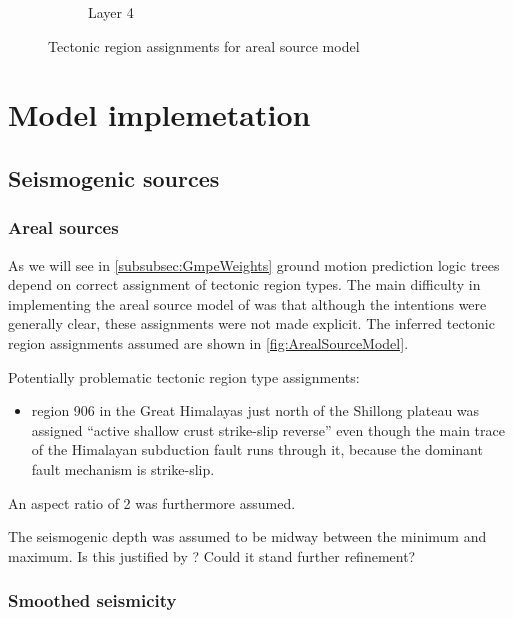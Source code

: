 \documentclass{article}
\begin{document}
\begin{figure}
\begin{subfigure}[b]{0.48\textwidth}
        \caption{Layer 4}
        \label{fig:ArealLayer4}
    \end{subfigure}
    \caption[Tectonic region assignments for areal source model]
    {Tectonic region assignments for areal source model} 
    \label{fig:ArealSourceModel}
\end{figure}

\section{Model implemetation}
\label{sec:Model}

\subsection{Seismogenic sources}
\label{sec:Sources}

\cite{thingbaijam2012seismogenic}

\subsubsection{Areal sources}
\label{sec:Areal}

As we will see in \autoref{subsubsec:GmpeWeights} ground motion prediction logic trees depend on correct assignment of tectonic region types. The main difficulty in implementing the areal source model of  \cite{nath2012probabilistic} was that although the intentions were generally clear, these assignments were not made explicit. The inferred tectonic region assignments assumed are shown in \autoref{fig:ArealSourceModel}.

Potentially problematic tectonic region type assignments:
\begin{itemize}
\item region 906 in the Great Himalayas just north of the Shillong plateau was assigned ``active shallow crust strike-slip reverse'' even though the main trace of the Himalayan subduction fault runs through it, because the dominant fault mechanism is strike-slip. 
\end{itemize}

An aspect ratio of 2 was furthermore assumed.

The seismogenic depth was assumed to be midway between the minimum and maximum. Is this justified by \cite{thingbaijam2012seismogenic}? Could it stand further refinement?


\subsubsection{Smoothed seismicity}
\label{sec:Smoothed}
\end{document}
